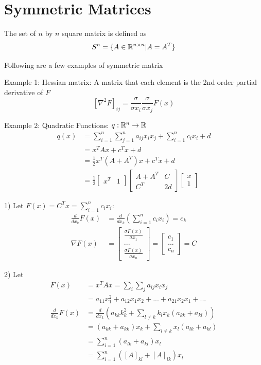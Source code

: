 \section{Symmetric Matrices}
The set of $n$ by $n$ square matrix is defined as
$$S^n = \{A\in \mathbb{R}^{n\times n} | A = A^T \}$$

\vspace{0.3cm}
Following are a few examples of symmetric matrix

Example 1: Hessian matrix: A matrix that each element is the 2nd order partial derivative of $F$
$$[\nabla^2 F]_{ij} = \frac{\sigma}{\sigma x_i}\frac{\sigma}{\sigma x_j}F(x)$$

Example 2: Quadratic Functions: $q: \mathbb{R}^n \rightarrow \mathbb{R}$
\begin{align*}
q(x) &= \sum^n_{i=1}\sum^n_{j=1}a_{ij}x_ix_j + \sum^n_{i=1}c_ix_i + d\\
&= x^TAx + c^Tx + d\\
&= \frac{1}{2}x^T(A + A^T)x + c^Tx + d\\
&= \frac{1}{2}
\begin{bmatrix}%
x^T& 1
\end{bmatrix}
\begin{bmatrix}%
A + A^T & C\\
C^T & 2d
\end{bmatrix}
\begin{bmatrix}%
x\\
1
\end{bmatrix}
\end{align*}


1) Let $F(x) = C^Tx = \sum^n_{i=1}c_ix_i$:
\begin{align*}
\frac{d}{dx_k}F(x) &= \frac{d}{dx_k}(\sum^n_{i=1}c_ix_i) = c_k\\
\nabla F(x) &= 
\begin{bmatrix}%
\frac{\sigma F(x)}{\sigma x_1}\\
...\\
\frac{\sigma F(x)}{\sigma x_n}
\end{bmatrix}=
\begin{bmatrix}%
c_1\\
...\\
c_n
\end{bmatrix} = C
\end{align*}

2) Let
\begin{align*}
F(x) &= x^TAx = \sum_i\sum_ja_{ij}x_ix_j\\
&= a_{11}x_1^2 + a_{12}x_1x_2 + ... + a_{21}x_2x_1 + ...\\
\frac{d}{dx_k}F(x) &= \frac{d}{dx_k}(a_{kk}k_k^2 + \sum_{l\neq k}k_lx_k(a_{kk}+a_{kl}))\\
&= (a_{kk} + a_{kk})x_k + \sum_{l\neq k}x_l(a_{lk} + a_{kl}) \\
&= \sum^n_{i=1}(a_{lk} + a_{kl})x_l\\
&= \sum^n_{i=1}([A]_{kl} + [A]_{lk})x_l
\end{align*}

